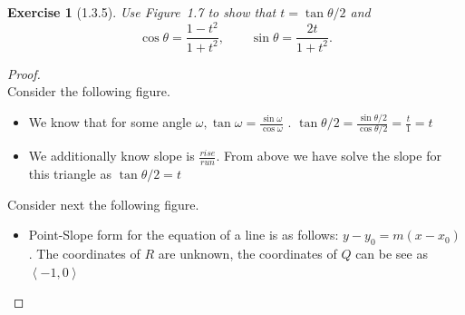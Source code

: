 \documentclass[10pt]{article}
\theoremstyle{plain}
\newtheorem{ex}{Exercise}
\begin{document}
\hrulefill

\begin{ex} [1.3.5]
  Use Figure~1.7 to show that $\displaystyle t=\tan\theta/2$ and
  \[
    \cos\theta=\frac{1-t^2}{1+t^2},\qquad\sin\theta=\frac{2t}{1+t^2}.
  \]
\end{ex}

\begin{proof}
  \ \\
  Consider the following figure. \\
  \begin{center}
  \end{center}
  \begin{itemize}
    \item We know that for some angle $\displaystyle \omega, \tan{\omega} = \frac{\sin{\omega}}{\cos\omega}$ .
    \subitem $\displaystyle \tan{\theta/2} = \frac{\sin{\theta/2}}{\cos\theta/2} = \frac{t}{1} = t$
    \item We additionally know slope is $\displaystyle \frac{rise}{run}$.
    \subitem From above we have solve the slope for this triangle as $\displaystyle \tan{\theta/2} = t$
  \end{itemize}
  Consider next the following figure. \\
  \begin{center}
  \end{center}
  \begin{itemize}
    \item Point-Slope form for the equation of a line is as follows: $y-y_{0} = m(x-x_{0})$.
    \subitem The coordinates of $R$ are unknown, the coordinates of $Q$ can be see as $\left< -1,0 \right>$

\end{itemize}
\end{proof}
\end{document}
